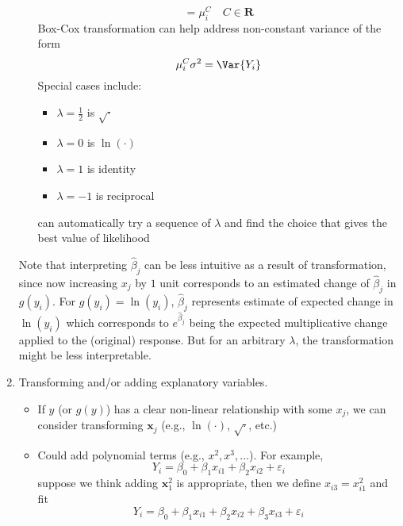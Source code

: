 \begin{enumerate}[label=(\arabic*)]
\begin{enumerate}[label=(\roman*)]
\[                              =\mu_i^C \quad {C\in\mathbf{R}}  \]
                        Box-Cox transformation can help address non-constant
                        variance of the form
                        \[ \mu_i^C\sigma^2=\Var{Y_i} \]
                        Special cases include:
                        \begin{itemize}
                              \item $ \displaystyle \lambda=\frac{1}{2} $ is $ \sqrt{\cdot} $
                              \item $ \lambda=0 $ is $ \ln(\cdot) $
                              \item $ \lambda=1 $ is identity
                              \item $ \lambda=-1 $ is reciprocal
                        \end{itemize}
                        can automatically try a sequence of $ \lambda $
                        and find the choice that gives the best value of
                        likelihood
            \end{enumerate}
            Note that interpreting $ \hat{\beta}_j $ can be less intuitive
            as a result of transformation, since now increasing $ x_j $
            by $ 1 $ unit corresponds to an estimated change of $ \hat{\beta}_j $
            in $ g(y_i) $. For $ g(y_i)=\ln(y_i) $, $ \hat{\beta}_j $
            represents estimate of expected change in $ \ln(y_i) $
            which corresponds to $ e^{\hat{\beta}_j} $ being
            the expected multiplicative change applied to the (original)
            response. But for an arbitrary $ \lambda $, the transformation
            might be less interpretable.
      \item Transforming and/or adding explanatory variables.
            \begin{itemize}
                  \item If $ y $ (or $ g(y) $) has a clear non-linear
                        relationship with some $ x_j $, we can consider transforming
                        $ \symbf{x}_j $ (e.g., $ \ln(\cdot) $, $ \sqrt{\cdot} $, etc.)
                  \item Could add polynomial terms (e.g., $ x^2,x^3,\ldots$). For example,
                        \[ Y_i=\beta_0+\beta_1x_{i1}+\beta_2x_{i2}+\varepsilon_i \]
                        suppose we think adding $ \symbf{x}_1^2 $ is appropriate,
                        then we define $ x_{i3}=x_{i1}^2 $ and fit
                        \[ Y_i=\beta_0+\beta_1x_{i1}+\beta_2x_{i2}+\beta_3x_{i3}+\varepsilon_i \]

\end{itemize}
\end{enumerate}
